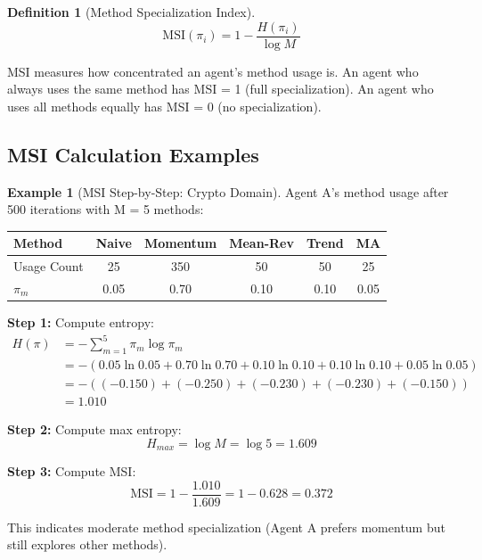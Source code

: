 \documentclass[11pt,a4paper]{article}
\theoremstyle{definition}
\newtheorem{definition}{Definition}[section]
\newtheorem{example}{Example}[section]
\theoremstyle{plain}
\newcommand{\MSI}{\text{MSI}}
\begin{document}
\begin{definition}[Method Specialization Index]
\begin{equation}
\MSI(\pi_i) = 1 - \frac{H(\pi_i)}{\log M}
\end{equation}
\end{definition}

\begin{intuition}
MSI measures how concentrated an agent's method usage is. An agent who always uses the same method has MSI = 1 (full specialization). An agent who uses all methods equally has MSI = 0 (no specialization).
\end{intuition}

\subsection{MSI Calculation Examples}

\begin{example}[MSI Step-by-Step: Crypto Domain]
Agent A's method usage after 500 iterations with M = 5 methods:

\begin{center}
\begin{tabular}{l|ccccc}
\toprule
Method & Naive & Momentum & Mean-Rev & Trend & MA \\
\midrule
Usage Count & 25 & 350 & 50 & 50 & 25 \\
$\pi_m$ & 0.05 & 0.70 & 0.10 & 0.10 & 0.05 \\
\bottomrule
\end{tabular}
\end{center}

\textbf{Step 1:} Compute entropy:
\begin{align}
H(\pi) &= -\sum_{m=1}^{5} \pi_m \log \pi_m \\
&= -(0.05 \ln 0.05 + 0.70 \ln 0.70 + 0.10 \ln 0.10 + 0.10 \ln 0.10 + 0.05 \ln 0.05) \\
&= -((-0.150) + (-0.250) + (-0.230) + (-0.230) + (-0.150)) \\
&= 1.010
\end{align}

\textbf{Step 2:} Compute max entropy:
\begin{equation}
H_{max} = \log M = \log 5 = 1.609
\end{equation}

\textbf{Step 3:} Compute MSI:
\begin{equation}
\MSI = 1 - \frac{1.010}{1.609} = 1 - 0.628 = \boxed{0.372}
\end{equation}

This indicates moderate method specialization (Agent A prefers momentum but still explores other methods).
\end{example}
\end{document}
